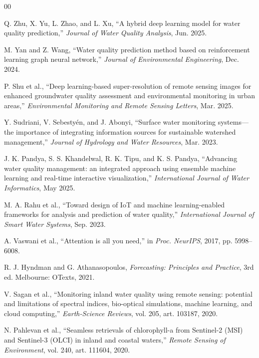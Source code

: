 \documentclass[conference]{IEEEtran}
\begin{document}
\begin{thebibliography}{00}

 Q. Zhu, X. Yu, L. Zhao, and L. Xu, ``A hybrid deep learning
model for water quality prediction,'' \emph{Journal of Water Quality Analysis},
Jun. 2025.

 M. Yan and Z. Wang, ``Water quality prediction method based
on reinforcement learning graph neural network,'' \emph{Journal of
Environmental Engineering}, Dec. 2024.

 P. Shu et al., ``Deep learning-based super-resolution of
remote sensing images for enhanced groundwater quality assessment and
environmental monitoring in urban areas,'' \emph{Environmental Monitoring and
Remote Sensing Letters}, Mar. 2025.

 Y. Sudriani, V. Sebesty\'en, and J. Abonyi,
``Surface water monitoring systems---the importance of integrating information
sources for sustainable watershed management,'' \emph{Journal of Hydrology and
Water Resources}, Mar. 2023.

 J. K. Pandya, S. S. Khandelwal, R. K. Tipu, and K. S.
Pandya, ``Advancing water quality management: an integrated approach using
ensemble machine learning and real-time interactive visualization,''
\emph{International Journal of Water Informatics}, May 2025.

 M. A. Rahu et al., ``Toward design of IoT and machine
learning-enabled frameworks for analysis and prediction of water quality,''
\emph{International Journal of Smart Water Systems}, Sep. 2023.

 A. Vaswani et al., ``Attention is all you need,'' in
\emph{Proc. NeurIPS}, 2017, pp. 5998--6008.

 R. J. Hyndman and G. Athanasopoulos, \emph{Forecasting:
Principles and Practice}, 3rd ed. Melbourne: OTexts, 2021.

 V. Sagan et al., ``Monitoring inland water quality using
remote sensing: potential and limitations of spectral indices, bio-optical
simulations, machine learning, and cloud computing,'' \emph{Earth-Science
Reviews}, vol. 205, art. 103187, 2020.

 N. Pahlevan et al., ``Seamless retrievals of chlorophyll-a
from Sentinel-2 (MSI) and Sentinel-3 (OLCI) in inland and coastal waters,''
\emph{Remote Sensing of Environment}, vol. 240, art. 111604, 2020.

\end{thebibliography}
\end{document}
